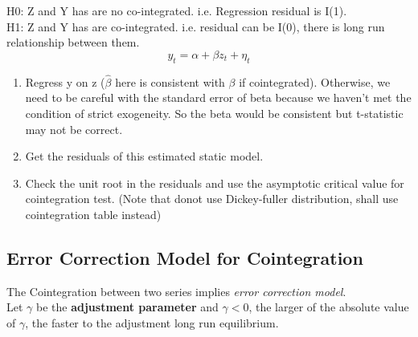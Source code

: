 \documentclass[12pt]{article}
\begin{document}
\noindent
H0: Z and Y has are no co-integrated. i.e. Regression residual is I(1).
\\
H1: Z and Y has are co-integrated. i.e. residual can be I(0), there is long run relationship between them.
\begin{equation}
    y_t = \alpha + \beta z_t + \eta_t
\end{equation}
\noindent
\begin{enumerate}
\item
Regress y on z ($\hat{\beta}$ here is consistent with $\beta$ if cointegrated). Otherwise, we need to be careful with the standard error of beta because we haven’t met the condition of strict exogeneity. So the beta would be consistent but t-statistic may not be correct. 
\item Get the residuals of this estimated static model.
\item Check the unit root in the residuals and use the asymptotic critical value for cointegration test. (Note that donot use Dickey-fuller distribution, shall use cointegration table instead)
\\
\end{enumerate}

{\color{RoyalBlue}
\subsection{Error Correction Model for Cointegration}}

The Cointegration between two series implies \textit{error correction model}.\\

Let $\gamma$ be the \textbf{adjustment parameter} and $\gamma < 0 $, the larger of the absolute value of $\gamma$, the faster to the adjustment long run equilibrium. 
\\
\end{document}
